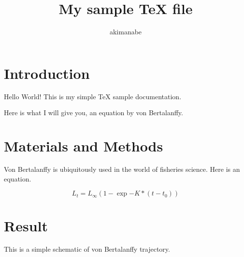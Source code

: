 \documentclass[a4paper,dvipdfmx]{jsarticle}
\begin{document}
\title{My sample TeX file}
\author{akimanabe}
\date{}

\maketitle

\section{Introduction}
Hello World! This is my simple TeX sample documentation.

Here is what I will give you, an equation by von Bertalanffy.

\section{Materials and Methods}

Von Bertalanffy is ubiquitously used in the world of fisheries science. Here is an equation.

\begin{equation}
L_t = L_\infty (1-\exp{-K * (t-t_0)})
\end{equation}

\section{Result}

This is a simple schematic of von Bertalanffy trajectory.
\end{document}
